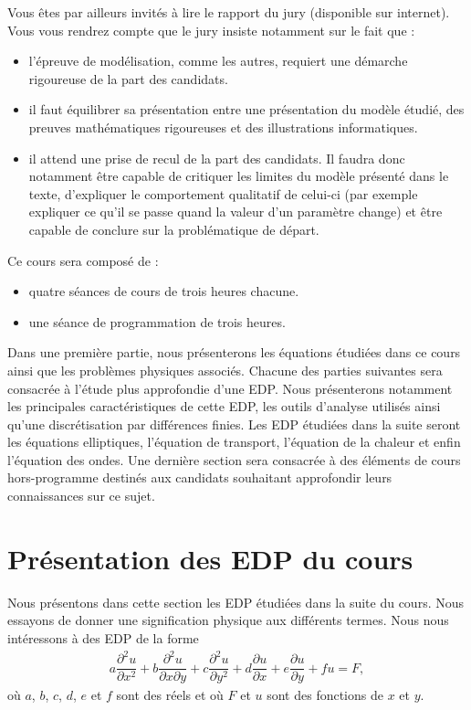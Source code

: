 \documentclass[12pt,a4paper,twoside]{article}
\begin{document}
Vous \^etes par ailleurs invit\'es \`a lire le rapport du jury (disponible sur internet).
Vous vous rendrez compte que le jury insiste notamment sur le fait que :
\begin{itemize}
\item l'\'epreuve de mod\'elisation, comme les autres, requiert une d\'emarche rigoureuse
  de la part des candidats.
\item il faut \'equilibrer sa pr\'esentation entre une pr\'esentation du mod\`ele \'etudi\'e,
  des preuves math\'ematiques rigoureuses et des illustrations informatiques.
\item il attend une prise de recul de la part des candidats.
  Il faudra donc notamment \^etre capable de critiquer les limites du mod\`ele pr\'esent\'e
  dans le texte, d'expliquer le comportement qualitatif de celui-ci 
  (par exemple expliquer ce qu'il se passe quand la valeur d'un param\`etre change)
  et \^etre capable de conclure sur la probl\'ematique de d\'epart.
\end{itemize}


Ce cours sera compos\'e de :
\begin{itemize}
\item quatre s\'eances de cours de trois heures chacune.
\item une s\'eance de programmation de trois heures.
\end{itemize}
Dans une premi\`ere partie, nous pr\'esenterons les \'equations \'etudi\'ees
dans ce cours ainsi que les probl\`emes physiques associ\'es.
Chacune des parties suivantes sera consacr\'ee \`a l'\'etude plus approfondie
d'une EDP. Nous pr\'esenterons notamment les principales caract\'eristiques de cette EDP,
les outils d'analyse utilis\'es ainsi qu'une discr\'etisation par diff\'erences finies.
Les EDP \'etudi\'ees dans la suite seront les \'equations elliptiques,
l'\'equation de transport, l'\'equation de la chaleur et enfin
l'\'equation des ondes.
Une derni\`ere section sera consacr\'ee \`a des \'el\'ements de cours
hors-programme destin\'es aux candidats souhaitant approfondir
leurs connaissances sur ce sujet.

\section{Pr\'esentation des EDP du cours}

Nous pr\'esentons dans cette section les EDP \'etudi\'ees dans la suite du cours.
Nous essayons de donner une signification physique aux diff\'erents termes.
Nous nous int\'eressons \`a des EDP de la forme
\begin{align}
  \label{eq:EDP_type}
  a \dfrac{\partial^2 u}{\partial x^2} + b \dfrac{\partial^2 u}{\partial x \partial y}
  + c \dfrac{\partial^2 u}{\partial y^2} + d \dfrac{\partial u}{\partial x}
  + e \dfrac{\partial u}{\partial y} + f u = F ,
\end{align}
o\`u $a$, $b$, $c$, $d$, $e$ et $f$ sont des r\'eels et o\`u $F$ et $u$
sont des fonctions de $x$ et $y$.
\end{document}
